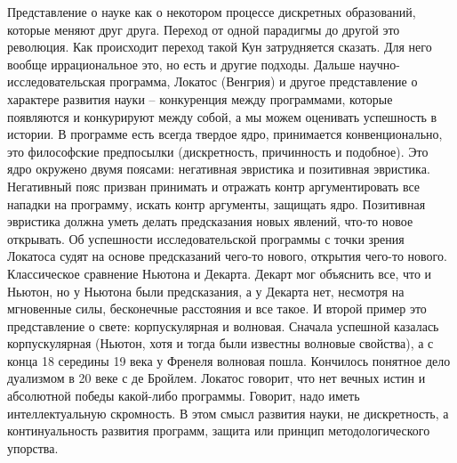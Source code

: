 \documentclass[a4paper, 12pt]{article}
\begin{document}
Представление о науке как о некотором процессе дискретных образований, 
которые меняют друг друга. Переход от одной парадигмы до другой это 
революция. Как происходит переход такой Кун затрудняется сказать. Для 
него вообще иррациональное это, но есть и другие подходы. Дальше 
научно-исследовательская программа, Локатос (Венгрия) и другое 
представление о характере развития науки -- конкуренция между 
программами, которые появляются и конкурируют между собой, а мы можем 
оценивать успешность в истории. В программе есть всегда твердое ядро, 
принимается конвенционально, это философские предпосылки (дискретность, 
причинность и подобное). Это ядро окружено  двумя поясами: негативная 
эвристика и позитивная эвристика. Негативный пояс призван принимать 
и отражать контр аргументировать все нападки на программу, искать контр 
аргументы, защищать ядро. Позитивная эвристика должна уметь делать 
предсказания новых явлений, что-то новое открывать. Об успешности 
исследовательской программы с точки зрения Локатоса судят на основе 
предсказаний чего-то нового, открытия чего-то нового. Классическое 
сравнение Ньютона и Декарта. Декарт мог объяснить все, что и Ньютон, но 
у Ньютона были предсказания, а у Декарта нет, несмотря на мгновенные 
силы, бесконечные расстояния и все такое. И второй пример это 
представление о свете: корпускулярная и волновая. Сначала успешной 
казалась корпускулярная (Ньютон, хотя и тогда были известны волновые 
свойства), а с конца 18 середины 19 века у Френеля волновая пошла. 
Кончилось понятное дело дуализмом в 20 веке с де Бройлем. Локатос 
говорит, что нет вечных истин и абсолютной победы какой-либо программы. 
Говорит, надо иметь интеллектуальную скромность. В этом смысл развития 
науки, не дискретность, а континуальность развития программ, защита или 
принцип методологического упорства.
\end{document}
